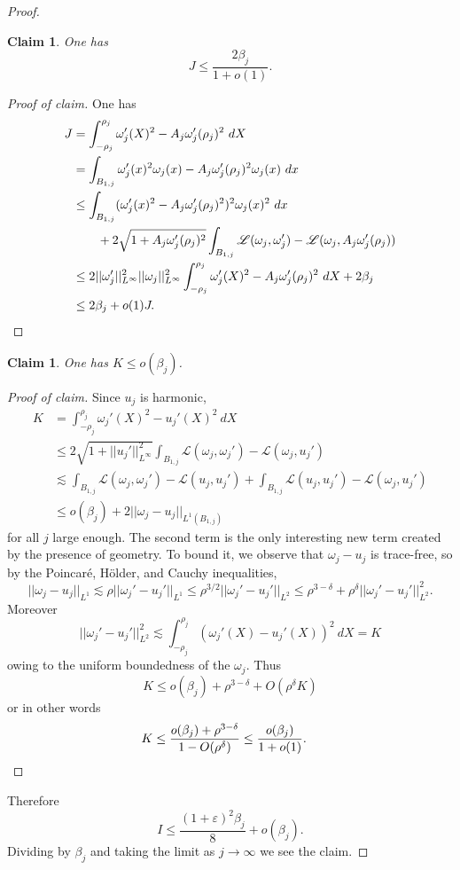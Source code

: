 \documentclass[reqno,12pt,letterpaper]{amsart}
\newtheorem{claim}[theorem]{Claim}
\theoremstyle{definition}
\numberwithin{equation}{section}
\begin{document}
\begin{proof}
\begin{claim}
One has
$$J \leq \frac{2\beta_j}{1 + o(1)}.$$
\end{claim}
\begin{proof}[Proof of claim]
One has
\begin{align*}
J &= \int_{-\rho_j}^{\rho_j} \omega_j'(X)^2 -  A_j \omega_j'(\rho_j)^2 ~dX \\
&= \int_{B_{1, j}} \omega_j'(x)^2 \omega_j(x) -  A_j \omega_j'(\rho_j)^2 \omega_j(x) ~dx \\
&\leq \int_{B_{1, j}} (\omega_j'(x)^2 -  A_j \omega_j'(\rho_j)^2)^2 \omega_j(x)^2 ~dx \\
&\qquad + 2\sqrt{1 +  A_j \omega_j'(\rho_j)^2} \int_{B_{1,j}} \mathscr L(\omega_j, \omega_j') - \mathscr L(\omega_j,  A_j \omega_j'(\rho_j)) \\
&\leq 2 ||\omega_j' ||_{L^\infty}^2 ||\omega_j||_{L^\infty}^2 \int_{-\rho_j}^{\rho_j} \omega_j'(X)^2 -  A_j \omega_j'(\rho_j)^2 ~dX + 2 \beta_j\\
&\leq 2\beta_j + o(1) J. \qedhere
\end{align*}
\end{proof}

\begin{claim}
One has $K \leq o(\beta_j)$.
\end{claim}
\begin{proof}[Proof of claim]
Since $u_j$ is harmonic,
\begin{align*}
K &= \int_{-\rho_j}^{\rho_j} \omega_j'(X)^2 - u_j'(X)^2 ~dX \\
&\leq 2 \sqrt{1 + ||u_j'||_{L^\infty}^2} \int_{B_{1,j}} \mathscr L(\omega_j, \omega_j') - \mathscr L(\omega_j, u_j')\\
&\lesssim \int_{B_{1, j}} \mathscr L(\omega_j, \omega_j') - \mathscr L(u_j, u_j') + \int_{B_{1, j}} \mathscr L(u_j, u_j') - \mathscr L(\omega_j, u_j') \\
&\leq o(\beta_j) + 2||\omega_j - u_j||_{L^1(B_{1,j})}
\end{align*}
for all $j$ large enough.
The second term is the only interesting new term created by the presence of geometry.
To bound it, we observe that $\omega_j - u_j$ is trace-free, so by the Poincar\'e, H\"older, and Cauchy inequalities,
$$||\omega_j - u_j||_{L^1} \lesssim \rho ||\omega_j' - u_j'||_{L^1} \leq \rho^{3/2} ||\omega_j' - u_j'||_{L^2} \leq \rho^{3 - \delta} + \rho^\delta ||\omega_j' - u_j'||_{L^2}^2.$$
Moreover
$$||\omega_j' - u_j'||_{L^2}^2 \lesssim \int_{-\rho_j}^{\rho_j} (\omega_j'(X) - u_j'(X))^2 ~dX = K$$
owing to the uniform boundedness of the $\omega_j$.
Thus
$$K \leq o(\beta_j) + \rho^{3 - \delta} + O(\rho^\delta K)$$
or in other words
\begin{align*}
K &\leq \frac{o(\beta_j) + \rho^{3 - \delta}}{1 - O(\rho^\delta)} \leq \frac{o(\beta_j)}{1 + o(1)}. \qedhere
\end{align*}
\end{proof}

Therefore
$$I \leq \frac{(1 + \varepsilon)^2\beta_j}{8} + o(\beta_j).$$
Dividing by $\beta_j$ and taking the limit as $j \to \infty$ we see the claim.
\end{proof}
\end{document}
